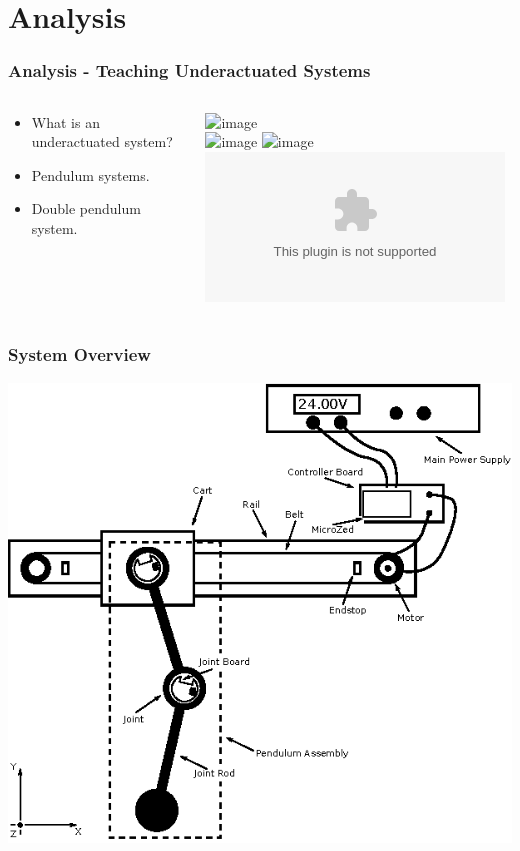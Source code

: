 \documentclass[mathserif]{beamer}
\begin{document}
\section{Analysis}

\begin{frame}[c]\frametitle{Analysis - Teaching Underactuated Systems}
	\begin{columns}
		\begin{column}[c]{.5\textwidth}
			\begin{itemize}[<+- | alert@+>]
				\item What is an underactuated system?
				\item Pendulum systems.
				\item Double pendulum system.
			\end{itemize}
		\end{column}
		\begin{column}[c]{.5\textwidth}
			\centering
			\includegraphics<1>[width=\linewidth]{graphics/robo_underactuated}\\
			\vspace{1cm}
			\includegraphics<1>[width=.50\linewidth]{graphics/robo_underactuated_picture}
			\includegraphics<2>[width=\linewidth]{graphics/segway}
			\includegraphics<3>[width=\linewidth]{graphics/joint_assembly.eps}
		\end{column}
	\end{columns}
\end{frame}

\begin{frame}[c]\frametitle{System Overview}
\centering
\includegraphics[scale=1]{graphics/system_overview}
\end{frame}
\end{document}

